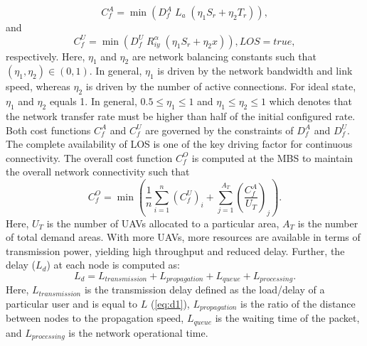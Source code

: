 \documentclass[journal]{IEEEtran}
\begin{document}
\begin{equation}\label{eq:4}
C_{f}^{A}=\min\left(D_{f}^{A}\; L_{a}\; \left(\eta_{1}S_{r} + \eta_{2}T_{r} \right)\right),
\end{equation}
and
\begin{equation}\label{eq:5}
C_{f}^{U}=\min\left(D_{f}^{U}\; R^{\alpha}_{iy}\; \left( \eta_{1}S_{r}+\eta_{2} x\right)\right), LOS=true,
\end{equation}
respectively. Here, $\eta_{1}$ and $\eta_{2}$ are network balancing constants such that $\left(\eta_{1}, \eta_{2} \right) \in \left(0,1\right)$. In general, $\eta_{1}$ is driven by the network bandwidth and link speed, whereas $\eta_{2}$ is driven by the number of active connections. For ideal state, $\eta_{1}$ and $\eta_{2}$ equals 1. In general, $0.5 \leq \eta_{1} \leq 1$ and $\eta_{1} \leq \eta_{2} \leq 1$ which denotes that the network transfer rate must be higher than half of the initial configured rate. Both cost functions $C_{f}^{A}$ and $C_{f}^{U}$ are governed by the constraints of $D_{f}^{A}$ and $D_{f}^{U}$. The complete availability of LOS is one of the key driving factor for continuous connectivity. The overall cost function $C_{f}^{O}$ is computed at the MBS to maintain the overall network connectivity such that
\begin{equation}\label{eq:6}
C_{f}^{O}=\min\left( \frac{1}{n} \sum_{i=1}^{n} \left(C_{f}^{U}\right)_{i} + \sum_{j=1}^{A_{T}} \left(\frac{C_{f}^{A}}{U_{T}} \right)_{j}\right).
\end{equation}
Here, $U_{T}$ is the number of UAVs allocated to a particular area, $A_{T}$ is the number of total demand areas. With more UAVs, more resources are available in terms of transmission power, yielding high throughput and reduced delay. Further, the delay ($L_{d}$) at each node is computed as:
\begin{equation}
L_{d}=L_{transmission}+L_{propagation}+L_{queue}+L_{processing}.
\end{equation}
Here, $L_{transmission}$ is the transmission delay defined as the load/delay of a particular user and is equal to $L$ (\ref{eq:d1}), $L_{propagation}$ is the ratio of the distance between nodes to the propagation speed, $L_{queue}$ is the waiting time of the packet, and $L_{processing}$ is the network operational time.
\end{document}
